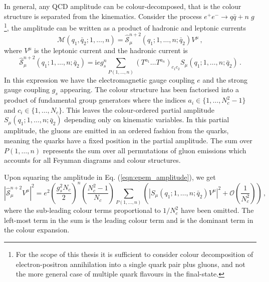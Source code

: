 \documentclass[main.tex]{subfiles}
\begin{document}
    In general, any QCD amplitude can be
    colour-decomposed, that is the colour structure is
    separated from the kinematics. Consider the process $e^{+}e^{-} \rightarrow q\bar{q} + n \; g$\footnote{For the scope of this thesis it is sufficient
    to consider colour decomposition of electron-positron
    annihilation into a single quark pair plus gluons,
    and not the more general case of multiple quark
    flavours in the final-state.},
    the amplitude can be written as a product of hadronic and
    leptonic currents \cite{Campbell:1998nn}
    \begin{equation}\label{eqn:epem_amplitude}
        \mathcal{M}(q_{1}, \bar{q}_{2}; 1, \ldots, n) = \hat{\mathcal{S}}_{\mu}^{n+2}(q_{1}; 1,\ldots,n; \bar{q}_{2})V^{\mu} \, ,
    \end{equation}
    where $V^{\mu}$ is the leptonic current and the hadronic
    current is
    \begin{equation}\label{eqn:hadronic_current}
        \hat{\mathcal{S}}_{\mu}^{n+2}(q_{1};1,\ldots,n;\bar{q}_{2}) = \mathrm{i}eg_{s}^{n} \sum_{P(1,\ldots,n)}(T^{a_{1}} \ldots T^{a_{n}})_{c_{1}c_{2}}S_{\mu}(q_{1};1,\ldots,n;\bar{q}_{2}) \, .
    \end{equation}
    In this expression we have the electromagnetic gauge coupling
    $e$ and the strong gauge coupling $g_{s}$ appearing. The colour
    structure has been factorised into a product of fundamental group
    generators where the indices $a_{i} \in \{1,\ldots, N_{c}^{2}-1\}$
    and $c_{i} \in \{1,\ldots,N_{c}\}$. This leaves the colour-ordered
    partial amplitude $S_{\mu}(q_{1};1,\ldots,n;\bar{q}_{2})$ depending
    only on kinematic variables. In this partial amplitude, the gluons
    are emitted in an ordered fashion from the quarks, meaning the quarks
    have a fixed position in the partial amplitude.
    The sum over $P(1,\ldots,n)$ represents the sum over all permutations
    of gluon emissions which accounts for all Feynman diagrams and colour structures.

    Upon squaring the amplitude in Eq. (\ref{eqn:epem_amplitude}), we get
    \begin{equation}\label{eqn:epem_me2}
        \left|\hat{\mathcal{S}}_{\mu}^{n+2}V^{\mu}\right|^{2} = e^{2}\left(\dfrac{g_{s}^{2}N_{c}}{2}\right)^{n}\left(\dfrac{N_{c}^{2}-1}{N_{c}}\right) \sum_{P(1,\ldots,n)} \left(\left|S_{\mu}(q_{1};1,\ldots,n;\bar{q}_{2})V^{\mu}\right|^{2} + \mathcal{O}\left(\dfrac{1}{N_{c}^{2}}\right)\right) \, ,
    \end{equation}
    where the sub-leading colour terms proportional to $1/N_{c}^{2}$ have been omitted.
    The left-most term in the sum is the leading colour term
    and is the dominant term in the colour expansion.
\end{document}
